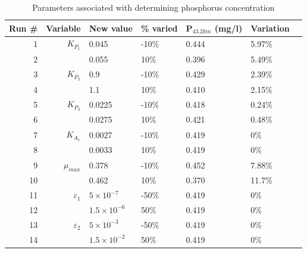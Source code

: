 \documentclass[titlepage,11pt]{article}
\begin{document}
\begin{table}[h]
\begin{center}
\caption{Parameters associated with determining phosphorus
concentration}
\begin{tabular}{|r|r|l|l|l|l|l|}
\hline
{\bf Run \#} & {\bf Variable} & {\bf New value}  & {\bf \% varied} & {\bf P$_{43.2 km}$ (mg/l)} & {\bf Variation}\\
\hline
         1 &       $K_{P_1}$  &     0.045        &       -10\%          & 0.444                     &5.97\%\\
         2 &                  &     0.055        &        10\%          &0.396                      &5.49\%\\
\hline
         3 &     $K_{P_2}$    &       0.9        &       -10\%          &0.429                      &2.39\%\\
         4 &                  &        1.1       &        10\%          &0.410                      &2.15\%\\
\hline
         5 &       $K_{P_3}$  &    0.0225        &       -10\%          &0.418                      &0.24\%\\
         6 &                  &    0.0275        &        10\%          &0.421                      &0.48\%\\
\hline
         7 & $K_{A_1}$        &0.0027            &       -10\%          &0.419                      &0\%\\
         8 &                  &0.0033            &        10\%          &0.419                      &0\%\\
\hline
         9 &      $\mu_{max}$ &  0.378           &       -10\%          &0.452                      &7.88\%\\
        10 &                  & 0.462            &        10\%          &0.370                      &11.7\%\\
\hline
        11 &  $\varepsilon_1$ & $5\times10^{-7}$ &       -50\%          &0.419                      &0\% \\
        12 &                  &$1.5\times10^{-6}$&        50\%          &0.419                      &0\% \\
\hline
        13 & $\varepsilon_2$  &$5\times10^{-3}$  &  -50\%               &0.419                      &0\%\\
        14 &                  &$1.5\times10^{-2}$&  50\%                &0.419                      &0\%\\
\hline
\end{tabular}
\end{center}
\end{table}
\end{document}
